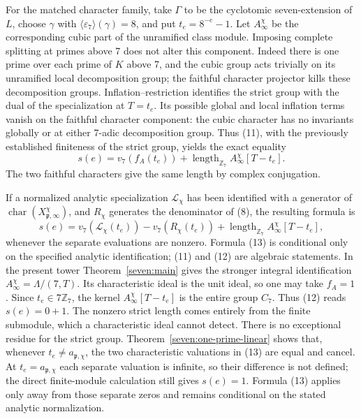 \documentclass[11pt]{article}
\newcommand{\Z}{\mathbb Z}\newcommand{\Q}{\mathbb Q}
\begin{document}
For the matched character family, take $\Gamma$ to be the cyclotomic seven-extension of $L$, choose $\gamma$ with $\langle\varepsilon_7\rangle(\gamma)=8$, and put $t_e=8^{-e}-1$. Let $A_\infty^\chi$ be the corresponding cubic part of the unramified class module. Imposing complete splitting at primes above 7 does not alter this component. Indeed there is one prime over each prime of $K$ above 7, and the cubic group acts trivially on its unramified local decomposition group; the faithful character projector kills these decomposition groups. Inflation--restriction identifies the strict group with the dual of the specialization at $T=t_e$. Its possible global and local inflation terms vanish on the faithful character component: the cubic character has no invariants globally or at either 7-adic decomposition group. Thus (11), with the previously established finiteness of the strict group, yields the exact equality
\[
 s(e)=v_7(f_A(t_e))+
       \operatorname{length}_{\Z_7}A_\infty^\chi[T-t_e].
\tag{12}
\]
The two faithful characters give the same length by complex conjugation.

If a normalized analytic specialization $\mathcal L_\chi$ has been identified with a generator of $\operatorname{char}(X_{\mathfrak p,\infty}^\chi)$, and $R_\chi$ generates the denominator of (8), the resulting formula is
\[
 s(e)=v_7(\mathcal L_\chi(t_e))-v_7(R_\chi(t_e))+
       \operatorname{length}_{\Z_7}A_\infty^\chi[T-t_e],
\tag{13}
\]
whenever the separate evaluations are nonzero. Formula (13) is conditional only on the specified analytic identification; (11) and (12) are algebraic statements. In the present tower Theorem~\ref{seven:main} gives the stronger integral identification $A_\infty^\chi=\Lambda/(7,T)$. Its characteristic ideal is the unit ideal, so one may take $f_A=1$. Since $t_e\in7\Z_7$, the kernel $A_\infty^\chi[T-t_e]$ is the entire group $C_7$. Thus (12) reads $s(e)=0+1$. The nonzero strict length comes entirely from the finite submodule, which a characteristic ideal cannot detect. There is no exceptional residue for the strict group. Theorem~\ref{seven:one-prime-linear} shows that, whenever $t_e\ne a_{\mathfrak p,\chi}$, the two characteristic valuations in (13) are equal and cancel. At $t_e=a_{\mathfrak p,\chi}$ each separate valuation is infinite, so their difference is not defined; the direct finite-module calculation still gives $s(e)=1$. Formula (13) applies only away from those separate zeros and remains conditional on the stated analytic normalization.
\end{document}
